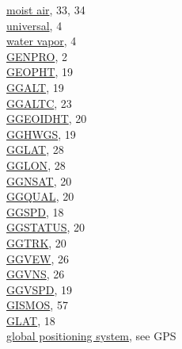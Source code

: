 \documentclass[
]{article}
\begin{document}
\hspace*{0.333em}\hspace*{0.333em}\href{./4-the-state-of-the-atmosphere.html\#moist-air}{moist
air}, 33, 34\\
\hspace*{0.333em}\hspace*{0.333em}\href{./1-introduction.html\#constants-and-symbols}{universal},
4\\
\hspace*{0.333em}\hspace*{0.333em}\href{./1-introduction.html\#constants-and-symbols}{water
vapor}, 4\\
\href{./1-introduction\#background-information}{GENPRO}, 2\\
\href{./3-the-state-of-the-aircraft.html\#geopth}{GEOPHT}, 19\\
\href{./3-the-state-of-the-aircraft.html\#ggalt}{GGALT}, 19\\
\href{./3-the-state-of-the-aircraft.html\#altx}{GGALTC}, 23\\
\href{./3-the-state-of-the-aircraft.html\#ggeoidht}{GGEOIDHT}, 20\\
\href{./3-the-state-of-the-aircraft.html\#gghwgs}{GGHWGS}, 19\\
\href{./3-the-state-of-the-aircraft.html\#gglat}{GGLAT}, 28\\
\href{./3-the-state-of-the-aircraft.html\#gglon}{GGLON}, 28\\
\href{./3-the-state-of-the-aircraft.html\#ggnsat}{GGNSAT}, 20\\
\href{./3-the-state-of-the-aircraft.html\#ggqual}{GGQUAL}, 20\\
\href{./3-the-state-of-the-aircraft.html\#ggspd}{GGSPD}, 18\\
\href{./3-the-state-of-the-aircraft.html\#ggstatus\%7C}{GGSTATUS}, 20\\
\href{./3-the-state-of-the-aircraft.html\#ggtrk}{GGTRK}, 20\\
\href{./3-the-state-of-the-aircraft.html\#ggvew}{GGVEW}, 26\\
\href{./3-the-state-of-the-aircraft.html\#ggvns}{GGVNS}, 26\\
\href{./3-the-state-of-the-aircraft.html\#ggvspd}{GGVSPD}, 19\\
\href{./3-the-state-of-the-aircraft.html\#special-use-remote}{GISMOS},
57\\
\href{./3-the-state-of-the-aircraft.html\#gglat}{GLAT}, 18\\
\href{./3-the-state-of-the-aircraft.html\#global-positioning-systems}{global
positioning system}, see GPS\\
\end{document}
